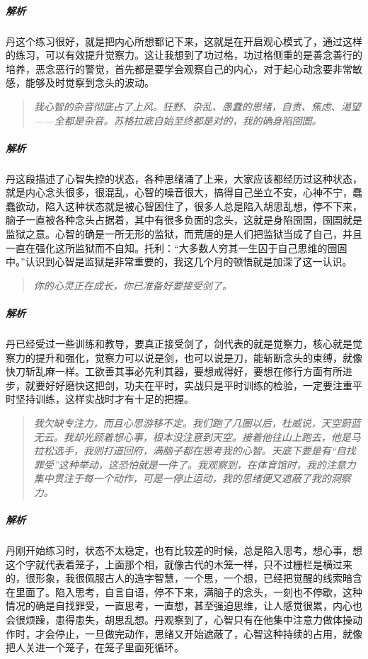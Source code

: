 \subparagraph{解析} 丹这个练习很好，就是把内心所想都记下来，这就是在开启观心模式了，通过这样的练习，可以有效提升觉察力。这让我想到了功过格，功过格侧重的是善念善行的培养，恶念恶行的警觉，首先都是要学会观察自己的内心，对于起心动念要非常敏感，能够及时觉察到念头的波动。

\begin{quote}\it
    我心智的杂音彻底占了上风。狂野、杂乱、愚蠢的思绪，自责、焦虑、渴望——全都是杂音。苏格拉底自始至终都是对的，我的确身陷囹圄。
\end{quote}

\subparagraph{解析} 丹这段描述了心智失控的状态，各种思绪涌了上来，大家应该都经历过这种状态，就是内心念头很多，很混乱，心智的噪音很大，搞得自己坐立不安，心神不宁，蠢蠢欲动，陷入这种状态就是被心智困住了，很多人总是陷入胡思乱想，停不下来，脑子一直被各种念头占据着，其中有很多负面的念头，这就是身陷囹圄，囹圄就是监狱之意。心智的确是一所无形的监狱，而荒唐的是人们把监狱当成了自己，并且一直在强化这所监狱而不自知。托利：“大多数人穷其一生囚于自己思维的囹圄中。”认识到心智是监狱是非常重要的，我这几个月的顿悟就是加深了这一认识。

\begin{quote}\it
    你的心灵正在成长，你已准备好要接受剑了。
\end{quote}

\subparagraph{解析} 丹已经受过一些训练和教导，要真正接受剑了，剑代表的就是觉察力，核心就是觉察力的提升和强化，觉察力可以说是剑，也可以说是刀，能斩断念头的束缚，就像快刀斩乱麻一样。工欲善其事必先利其器，要想戒得好，要想在修行方面有所进步，就要好好磨快这把剑，功夫在平时，实战只是平时训练的检验，一定要注重平时坚持训练，这样实战时才有十足的把握。

\begin{quote}\it
    我欠缺专注力，而且心思游移不定。我们跑了几圈以后，杜威说，天空蔚蓝无云。我却光顾着想心事，根本没注意到天空。接着他往山上跑去，他是马拉松选手，我则打道回府，满脑子都在思考我的心智。天底下要是有“自找罪受”这种举动，这恐怕就是一件了。我观察到，在体育馆时，我的注意力集中贯注于每一个动作，可是一停止运动，我的思绪便又遮蔽了我的洞察力。
\end{quote}

\subparagraph{解析} 丹刚开始练习时，状态不太稳定，也有比较差的时候，总是陷入思考，想心事，想这个字就代表着笼子，上面那个相，就像古代的木笼一样，只不过栅栏是横过来的，很形象，我很佩服古人的造字智慧，一个思，一个想，已经把觉醒的线索暗含在里面了。陷入思考，自言自语，停不下来，满脑子的念头，一刻也不停歇，这种情况的确是自找罪受，一直思考，一直想，甚至强迫思维，让人感觉很累，内心也会很烦躁，患得患失，胡思乱想。丹观察到了，心智只有在他集中注意力做体操动作时，才会停止，一旦做完动作，思绪又开始遮蔽了，心智这种持续的占用，就像把人关进一个笼子，在笼子里面死循环。

